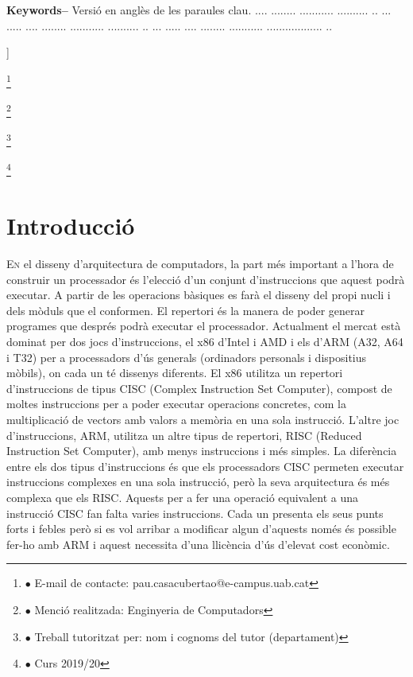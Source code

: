 \documentclass[10pt,a4paper,twocolumn,twoside]{article}
\newcommand\blfootnote[1]{%
  \begingroup
  \renewcommand\thefootnote{}\footnote{#1}%
  \addtocounter{footnote}{-1}%
  \endgroup
}
\begin{document}
\begin{@twocolumnfalse}
\begin{center}
{\\
\\
\textbf{Keywords-- } Versió en anglès de les paraules clau. .... ........ ........... .......... ..  ... ..... .... ........ ........... .......... ..  ... ..... .... ........ ........... .................. ..\\
}

\bigskip

{\vrule depth 0pt height 0.5pt width 4cm\hspace{7.5pt}%
%
\hspace{7.5pt}\vrule depth 0pt height 0.5pt width 4cm\relax}

\end{center}

\bigskip
\end{@twocolumnfalse}]


\blfootnote{$\bullet$ E-mail de contacte: pau.casacubertao@e-campus.uab.cat}
\blfootnote{$\bullet$ Menció realitzada: Enginyeria de Computadors }
\blfootnote{$\bullet$ Treball tutoritzat per: nom i cognoms del tutor (departament)}
\blfootnote{$\bullet$ Curs 2019/20}



\section{Introducció}
\lettrine[lines=3]{E}{n} el disseny d'arquitectura de computadors, la part més important a l'hora de construir un processador és l'elecció d'un conjunt d'instruccions que aquest podrà executar. A partir de les operacions bàsiques es farà el disseny del propi nucli i dels mòduls que el conformen. 
El repertori és la manera de poder generar programes que després podrà executar el processador. Actualment el mercat està dominat per dos jocs d'instruccions, el x86 d'Intel i AMD i els d'ARM (A32, A64 i T32) per a processadors d'ús generals (ordinadors personals i dispositius mòbils), on cada un té dissenys diferents. El x86 utilitza un repertori d'instruccions de tipus CISC (Complex Instruction Set Computer), compost de moltes instruccions per a poder executar operacions concretes, com la multiplicació de vectors amb valors a memòria en una sola instrucció. L'altre joc d'instruccions, ARM, utilitza un altre tipus de repertori, RISC (Reduced Instruction Set Computer), amb menys instruccions i més simples. La diferència entre els dos tipus d'instruccions és que els processadors CISC permeten executar instruccions complexes en una sola instrucció, però la seva arquitectura és més complexa que els RISC. Aquests per a fer una operació equivalent a una instrucció CISC fan falta varies instruccions. Cada un presenta els seus punts forts i febles però si es vol  arribar a modificar algun d'aquests només és possible fer-ho amb ARM i aquest necessita d'una llicència d'ús d'elevat cost econòmic.
\end{document}
